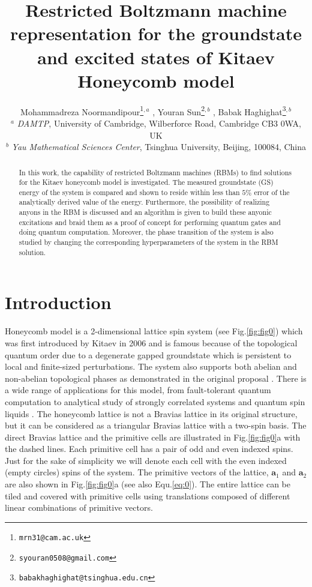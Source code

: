 \documentclass{article}
\title{Restricted Boltzmann machine representation for the groundstate and excited states of Kitaev Honeycomb model}
\author{
    Mohammadreza Noormandipour\thanks{\texttt{mrn31@cam.ac.uk}}\hspace{1mm}$^{,a}$ , Youran Sun\thanks{\texttt{syouran0508@gmail.com}}\hspace{1mm}$^{,b}$ , Babak Haghighat\thanks{\texttt{babakhaghighat@tsinghua.edu.cn}}\hspace{1mm}$^{,b}$ \\
	$^{a}$ \textit{DAMTP}, University of Cambridge, Wilberforce Road, Cambridge CB3 0WA, UK \\
	$^{b}$ \textit{Yau Mathematical Sciences Center}, Tsinghua University, Beijing, 100084, China\\
}
\begin{document}
\maketitle

\begin{abstract}
In this work, the capability of restricted Boltzmann machines (RBMs) to find solutions for the Kitaev honeycomb model is investigated. The measured groundstate (GS) energy of the system is compared and shown to reside within less than $5\%$ error of the analytically derived value of the energy. Furthermore, the possibility of realizing anyons in the RBM is discussed and an algorithm is given to build these anyonic excitations and braid them as a proof of concept for performing quantum gates and doing quantum computation. Moreover, the phase transition of the system is also studied by changing the corresponding hyperparameters of the system in the RBM solution.
\end{abstract}




\section{Introduction}
Honeycomb model is a 2-dimensional lattice spin system (see Fig.\hspace{0.2mm}\ref{fig:fig0}) which was first introduced by Kitaev in 2006 \cite{Kitaev_2006} and is famous because of the topological quantum order due to a degenerate gapped groundstate which is persistent to local and finite-sized perturbations. The system also supports both abelian and non-abelian topological phases as demonstrated in the original proposal \cite{Kitaev_2006}. There is a wide range of applications for this model, from fault-tolerant quantum computation \cite{Kitaev_2003} to analytical study of strongly correlated systems \cite{Jackeli_2009} and quantum spin liquids \cite{Tikhonov_2011}. The honeycomb lattice is not a Bravias lattice in its original structure, but it can be considered as a triangular Bravias lattice with a two-spin basis. The direct Bravias lattice and the primitive cells are illustrated in Fig.\hspace{0.2mm}\ref{fig:fig0}a with the dashed lines. Each primitive cell has a pair of odd and even indexed spins. Just for the sake of simplicity we will denote each cell with the even indexed (empty circles) spins of the system. The primitive vectors of the lattice, $\textbf{a}_1$ and $\textbf{a}_2$ are also shown in Fig.\hspace{0.2mm}\ref{fig:fig0}a (see also Equ.\hspace{0.2mm}\ref{eq:0}). The entire lattice can be tiled and covered with primitive cells using translations composed of different linear combinations of primitive vectors. 
\end{document}

